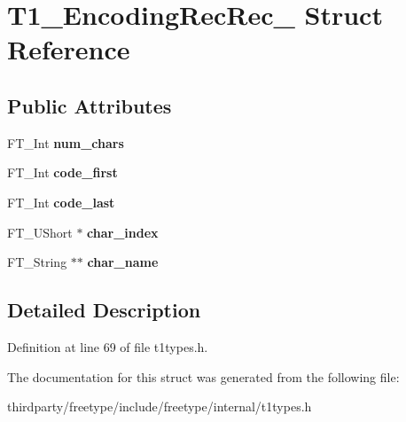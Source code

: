 \hypertarget{struct_t1___encoding_rec_rec__}{}\section{T1\+\_\+\+Encoding\+Rec\+Rec\+\_\+ Struct Reference}
\label{struct_t1___encoding_rec_rec__}
\subsection*{Public Attributes}
\begin{DoxyCompactItemize}
\item 
\mbox{\label{struct_t1___encoding_rec_rec___af1468d5bad99cccebeb0387713999e9c}} 
F\+T\+\_\+\+Int {\bfseries num\+\_\+chars}
\item 
\mbox{\label{struct_t1___encoding_rec_rec___ae21aad8cbb10c8fd94e9f30c60542662}} 
F\+T\+\_\+\+Int {\bfseries code\+\_\+first}
\item 
\mbox{\label{struct_t1___encoding_rec_rec___a9be1faadf0ce11d12d3bce600e1f2a9d}} 
F\+T\+\_\+\+Int {\bfseries code\+\_\+last}
\item 
\mbox{\label{struct_t1___encoding_rec_rec___a0c00a7b5c5ec7ba5eba667252f11f199}} 
F\+T\+\_\+\+U\+Short $\ast$ {\bfseries char\+\_\+index}
\item 
\mbox{\label{struct_t1___encoding_rec_rec___acf21f77cff90336fb9f297799aaf26eb}} 
F\+T\+\_\+\+String $\ast$$\ast$ {\bfseries char\+\_\+name}
\end{DoxyCompactItemize}


\subsection{Detailed Description}


Definition at line 69 of file t1types.\+h.



The documentation for this struct was generated from the following file\+:\begin{DoxyCompactItemize}
\item 
thirdparty/freetype/include/freetype/internal/t1types.\+h\end{DoxyCompactItemize}
